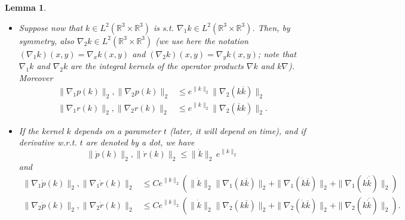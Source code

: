 \documentclass[11pt,a4paper]{article}
\newtheorem{lem}[thm]{Lemma}
\newcommand{\bR}{{\mathbb R}}
\begin{document}
\begin{lem}
\begin{itemize}
\begin{equation}
\end{equation}
\item[(iv)] Suppose now that $k \in L^2 (\bR^3 \times \bR^3)$ is s.t. $\nabla_1 k  \in L^2 (\bR^3 \times \bR^3)$. Then, by symmetry, also $\nabla_2 k \in L^2 (\bR^3 \times \bR^3)$ (we use here the notation $(\nabla_1 k) (x,y) = \nabla_x k (x,y)$ and $(\nabla_2 k)(x,y) = \nabla_y k (x,y)$; note that $\nabla_1 k$ and $\nabla_2 k$ are the integral kernels of the operator products $\nabla k$ and $k \nabla$). Moreover 
\[  \begin{split}  \| \nabla_1 p (k) \|_{2} , \| \nabla_2 p (k) \|_2 & \le e^{\| k \|_{2}} \| \nabla_2 (k \overline{k}) \|_{2} \\
 \| \nabla_1 r (k)  \|_{2}, \| \nabla_2 r (k) \|_2 & \le e^{\| k \|_{2}} \| \nabla_2 (\overline{k} k)   \|_2.%
  \end{split} \]
\item[(v)] If the kernel $k$ depends on a parameter $t$ (later, it will depend on time), and if derivative w.r.t. $t$ are denoted by a dot, we have
\[   \| \dot{p} (k) \|_2 , \| \dot{r} (k)\|_2  \leq \| \dot{k} \|_2 \, e^{\| k \|_2} \]
and
\[ \begin{split} 
\| \nabla_1 \dot p (k) \|_2 , \| \nabla_1 \dot r (k) \|_2  &\leq C  e^{\| k \|_2} \left( \| \dot k \|_2 \| \nabla_1 (k\overline{k}) \|_2 + \| \nabla_1 (\dot{k} \overline{k}) \|_2 + \| \nabla_1 (k \overline{\dot{k}}) \|_2 \right) \\
 \| \nabla_2 \dot p (k) \|_2 , \| \nabla_2 \dot r (k) \|_2  &\leq C  e^{\| k \|_2} \left( \| \dot k \|_2 \| \nabla_2 (k\overline{k}) \|_2 + \| \nabla_2 (\dot{k} \overline{k}) \|_2 + \| \nabla_2 (k \overline{\dot{k}}) \|_2 \right). 
 \end{split} \]
\end{itemize}
\end{lem}
\end{document}
